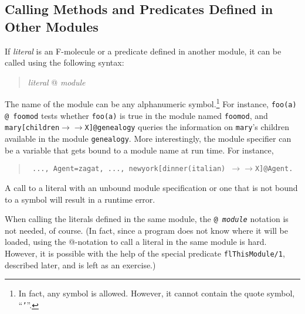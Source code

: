 \documentclass[11pt]{article}
\newcommand{\mvd}{\ensuremath{{\rightarrow\!\!\!\!\rightarrow}}}  %
\begin{document}
\subsection{Calling Methods and Predicates Defined in Other Modules}


%
If \emph{literal} is an F-molecule or a predicate defined in another
module, it can be called using the following syntax:
\begin{quote}
\emph{literal} @ \emph{module} 
\end{quote}
The name of the module can be any alphanumeric symbol.\footnote{
  In fact, any symbol is allowed. However, it cannot contain the quote
  symbol, ``{\tt '}''.
  }
For instance, \verb|foo(a) @ foomod| tests whether {\tt foo(a)} is true in
the module named {\tt foomod}, and {\tt mary[children\mvd X]@genealogy}
queries the information on {\tt mary}'s children available in the module
{\tt genealogy}. More interestingly, the module specifier can be a variable
that gets bound to a module name at run time. For instance, 
\begin{quote}
 {\tt
   ..., Agent=zagat, ..., newyork[dinner(italian) \mvd X]@Agent.
   }
\end{quote}
A call to a literal with an unbound module specification or one that is not
bound to a symbol will result in a runtime error.

When calling the literals defined in the same module, the {\tt @{\it
    module}} notation is not needed, of course. (In fact, since a program
does not know where it will be loaded, using the @-notation to call a
literal in the same module is hard. However, it is possible with the help
of the special predicate {\tt flThisModule/1}, described later, and is left
as an exercise.)
\end{document}
